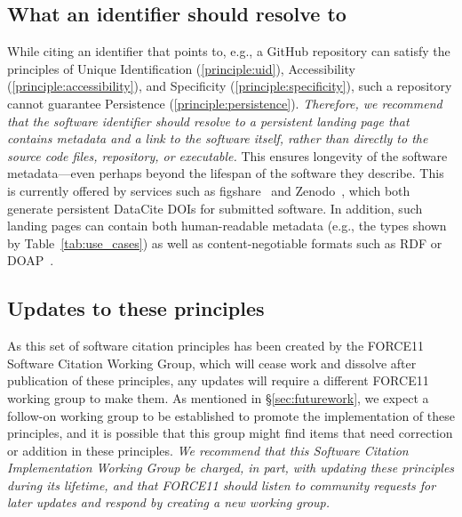 \documentclass[12pt, oneside]{amsart}
\newcommand{\katznote}[1]{ {\textcolor{blue} { ***DSK: #1 }}} %
\newcommand{\LJHnote}[1]{ {\textcolor{fuschsia} { ***LJH: #1 }}} %
\begin{document}
\subsection{What an identifier should resolve to}

While citing an identifier that points to, e.g., a GitHub repository can satisfy the principles of Unique Identification (\ref{principle:uid}), Accessibility (\ref{principle:accessibility}), and Specificity (\ref{principle:specificity}), such a repository cannot guarantee Persistence (\ref{principle:persistence}).
\textit{Therefore, we recommend that the software identifier should resolve to a persistent landing page that contains metadata and a link to the software itself, rather than directly to the source code files, repository, or executable.}
This ensures longevity of the software metadata---even perhaps beyond the lifespan of the software they describe.
This is currently offered by services such as figshare~\cite{figshare} and Zenodo~\cite{github-citable-code-guide}, which both generate persistent DataCite DOIs for submitted software.
In addition, such landing pages can contain both human-readable metadata (e.g., the types shown by Table~\ref{tab:use_cases}) as well as content-negotiable formats such as RDF or DOAP~\cite{DOAP}.


%

\subsection{Updates to these principles}

As this set of software citation principles has been created by the FORCE11 Software Citation Working Group, which will cease work and dissolve after publication of these principles,
any updates will require a different FORCE11 working group to make them.
As mentioned in \S\ref{sec:futurework}, we expect a follow-on working group to be established to promote the implementation of
these principles, and it is possible that this group might find items that need correction or addition
in these principles.
\textit{We recommend that this Software Citation Implementation Working Group be charged, in part,
with updating these principles during its lifetime, and that FORCE11 should listen to community requests for later updates and respond by creating a new working group.}
\end{document}
